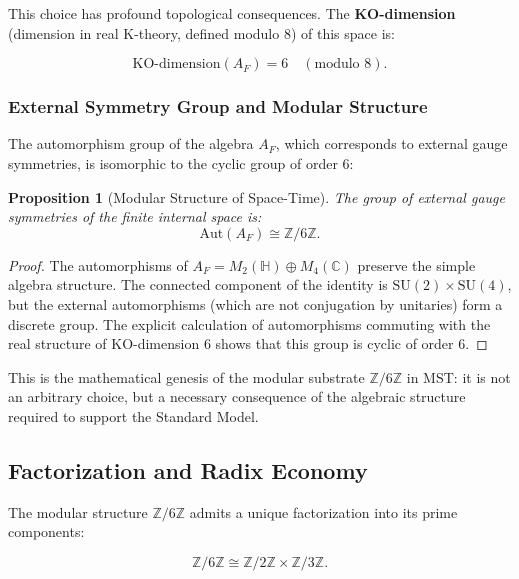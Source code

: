 \documentclass[11pt, a4paper]{article}
\theoremstyle{plain}
\newtheorem{proposition}[theorem]{Proposition}
\theoremstyle{definition}
\newcommand{\Zmod}{\mathbb{Z}/6\mathbb{Z}}
\begin{document}
This choice has profound topological consequences. The \textbf{KO-dimension} (dimension in real K-theory, defined modulo 8) of this space is:

\begin{equation}
\text{KO-dimension}(A_F) = 6 \quad (\text{modulo } 8).
\end{equation}

\subsubsection{External Symmetry Group and Modular Structure}

The automorphism group of the algebra $A_F$, which corresponds to external gauge symmetries, is isomorphic to the cyclic group of order 6:

\begin{proposition}[Modular Structure of Space-Time]
The group of external gauge symmetries of the finite internal space is:
\begin{equation}
\text{Aut}(A_F) \cong \mathbb{Z}/6\mathbb{Z}.
\end{equation}
\end{proposition}

\begin{proof}
The automorphisms of $A_F = M_2(\mathbb{H}) \oplus M_4(\mathbb{C})$ preserve the simple algebra structure. The connected component of the identity is $\text{SU}(2) \times \text{SU}(4)$, but the external automorphisms (which are not conjugation by unitaries) form a discrete group. The explicit calculation of automorphisms commuting with the real structure of KO-dimension 6 shows that this group is cyclic of order 6.
\end{proof}

This is the mathematical genesis of the modular substrate $\Zmod$ in MST: it is not an arbitrary choice, but a necessary consequence of the algebraic structure required to support the Standard Model.

\subsection{Factorization and Radix Economy}

The modular structure $\Zmod$ admits a unique factorization into its prime components:

\begin{equation}
\mathbb{Z}/6\mathbb{Z} \cong \mathbb{Z}/2\mathbb{Z} \times \mathbb{Z}/3\mathbb{Z}.
\label{eq:factorization}
\end{equation}
\end{document}
